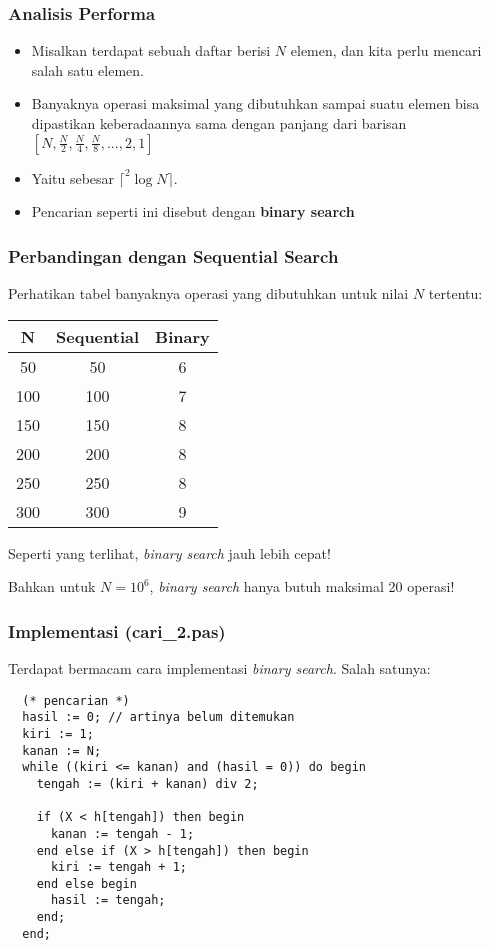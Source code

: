 \documentclass{beamer}
\begin{document}
\begin{frame}
\frametitle{Analisis Performa}
\begin{itemize}
  \item Misalkan terdapat sebuah daftar berisi $N$ elemen, dan kita perlu mencari salah satu elemen.
  \item Banyaknya operasi maksimal yang dibutuhkan sampai suatu elemen bisa dipastikan keberadaannya sama dengan panjang dari barisan $[N, \frac{N}{2}, \frac{N}{4}, \frac{N}{8}, ..., 2, 1]$
  \item Yaitu sebesar $\lceil ^2\log{N} \rceil$.
  \item Pencarian seperti ini disebut dengan \alert{\textbf{binary search}}
\end{itemize}
\end{frame}

\begin{frame}
\frametitle{Perbandingan dengan Sequential Search}
Perhatikan tabel banyaknya operasi yang dibutuhkan untuk nilai $N$ tertentu:
\begin{table}[ht]
  \begin{tabular}{|c|c|c|}
    \hline N  & Sequential  & Binary \\
    \hline 50 & 50 & 6 \\
    \hline 100 & 100 & 7 \\
    \hline 150 & 150 & 8 \\
    \hline 200 & 200 & 8 \\
    \hline 250 & 250 & 8 \\
    \hline 300 & 300 & 9 \\
    \hline
  \end{tabular}
\end{table}
Seperti yang terlihat, \textit{binary search} jauh lebih cepat!

Bahkan untuk $N = 10^6$, \textit{binary search} hanya butuh maksimal 20 operasi!
\end{frame}

\begin{frame}[fragile]
\frametitle{Implementasi (cari\_2.pas)}
Terdapat bermacam cara implementasi \textit{binary search}. Salah satunya:
\begin{lstlisting}
  (* pencarian *)
  hasil := 0; // artinya belum ditemukan
  kiri := 1;
  kanan := N;
  while ((kiri <= kanan) and (hasil = 0)) do begin
    tengah := (kiri + kanan) div 2;

    if (X < h[tengah]) then begin
      kanan := tengah - 1;
    end else if (X > h[tengah]) then begin
      kiri := tengah + 1;
    end else begin
      hasil := tengah;
    end;
  end;
\end{lstlisting}
\end{frame}
\end{document}
